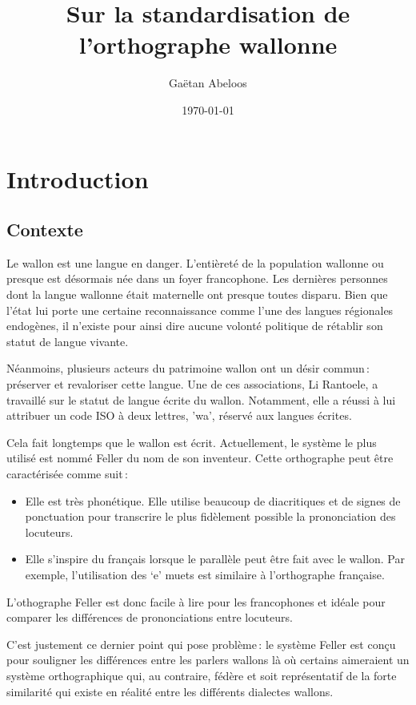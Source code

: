 \documentclass[french]{article}
\begin{document}
\title{Sur la standardisation de l'orthographe wallonne}
\author{Gaëtan Abeloos}
\date{\today}

\maketitle

\section{Introduction}

\subsection{Contexte}

Le wallon est une langue en danger. L'entièreté de la population wallonne ou presque est désormais née dans un foyer francophone. Les dernières personnes dont la langue wallonne était maternelle ont presque toutes disparu. Bien que l'état lui porte une certaine reconnaissance comme l'une des langues régionales endogènes, il n'existe pour ainsi dire aucune volonté politique de rétablir son statut de langue vivante.

Néanmoins, plusieurs acteurs du patrimoine wallon ont un désir commun\,: préserver et revaloriser cette langue. Une de ces associations, Li Rantoele, a travaillé sur le statut de langue écrite du wallon. Notamment, elle a réussi à lui attribuer un code ISO à deux lettres, 'wa', réservé aux langues écrites.

Cela fait longtemps que le wallon est écrit. Actuellement, le système le plus utilisé est nommé Feller du nom de son inventeur. Cette orthographe peut être caractérisée comme suit\,:
\begin{itemize}
	\item Elle est très phonétique. Elle utilise beaucoup de diacritiques et de signes de ponctuation pour transcrire le plus fidèlement possible la prononciation des locuteurs.
	\item Elle s'inspire du français lorsque le parallèle peut être fait avec le wallon. Par exemple, l'utilisation des `e' muets est similaire à l'orthographe française.
\end{itemize}
L'othographe Feller est donc facile à lire pour les francophones et idéale pour comparer les différences de prononciations entre locuteurs.

C'est justement ce dernier point qui pose problème\,: le système Feller est conçu pour souligner les différences entre les parlers wallons là où certains aimeraient un système orthographique qui, au contraire, fédère et soit représentatif de la forte similarité qui existe en réalité entre les différents dialectes wallons.
\end{document}
